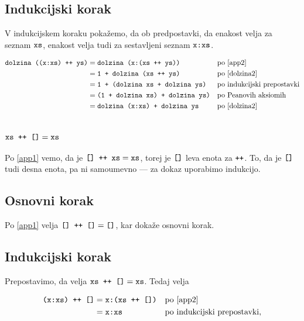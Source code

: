 \documentclass[11pt,a4paper]{article}
\begin{document}
\subsection*{Indukcijski korak}

V indukcijskem koraku pokažemo, da ob predpostavki, da enakost velja za seznam $\mbox{\texttt{xs}}$,
enakost velja tudi za sestavljeni seznam $\mbox{\texttt{x:xs}}$.

\begin{align*}
  \mbox{\texttt{dolzina ((x:xs) ++ ys)}}
  &= \mbox{\texttt{dolzina (x:(xs ++ ys))}}
    &&\text{po \eqref{app2}} \\
  &= \mbox{\texttt{1 + dolzina (xs ++ ys)}}
    &&\text{po \eqref{dolzina2}} \\
  &= \mbox{\texttt{1 + (dolzina xs + dolzina ys)}}
    &&\text{po indukcijski prepostavki} \\
  &= \mbox{\texttt{(1 + dolzina xs) + dolzina ys)}}
    &&\text{po Peanovih aksiomih} \\
  &= \mbox{\texttt{dolzina (x:xs) + dolzina ys}}
    &&\text{po \eqref{dolzina2}}
\end{align*}


\section{$\mbox{\texttt{xs ++ []}} = \mbox{\texttt{xs}}$}
\label{sec:desna-enota}

Po \eqref{app1} vemo, da je $\mbox{\texttt{[] ++ xs}} = \mbox{\texttt{xs}}$, torej je $\mbox{\texttt{[]}}$ leva enota za $\mbox{\texttt{++}}$. To, da je $\mbox{\texttt{[]}}$ tudi desna enota, pa ni samoumevno --- za dokaz uporabimo indukcijo.

\subsection*{Osnovni korak}

Po \eqref{app1} velja $\mbox{\texttt{[] ++ []}} = \mbox{\texttt{[]}}$, kar dokaže osnovni korak.

\subsection*{Indukcijski korak}

Prepostavimo, da velja $\mbox{\texttt{xs ++ []}} = \mbox{\texttt{xs}}$. Tedaj velja

\begin{align*}
  \mbox{\texttt{(x:xs) ++ []}}
  &= \mbox{\texttt{x:(xs ++ [])}}
    &&\text{po \eqref{app2}} \\
  &= \mbox{\texttt{x:xs}}
    &&\text{po indukcijski prepostavki},
\end{align*}
\end{document}
